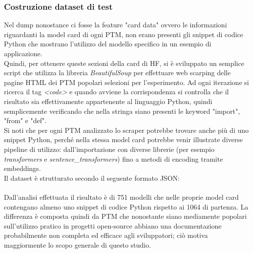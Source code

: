 \documentclass{article}
\begin{document}
\subsubsection{Costruzione dataset di test}
Nel dump \cite{ait_hfcommunity_2023} nonostance ci fosse la feature "card data" ovvero le informazioni riguardanti la model card di ogni PTM, non erano presenti gli snippet di codice Python che mostrano l'utilizzo del modello specifico in un esempio di applicazione.\\  
Quindi, per ottenere queste sezioni della card di HF, si è sviluppato un semplice script che utilizza la libreria \textit{BeautifulSoup}\cite{Richardson_Beautiful_Soup} per effettuare web scarping delle pagine HTML dei PTM popolari selezioni per l'esperimento. Ad ogni iterazione si ricerca il tag \textit{\textless code\textgreater} e quando avviene la corrispondenza si controlla che il risultato sia effettivamente appartenente al linguaggio Python, quindi semplicemente verificando che nella stringa siano presenti le keyword "import", "from" e "def".\\
Si noti che per ogni PTM analizzato lo scraper potrebbe trovare anche più di uno snippet Python, perché nella stessa model card potrebbe venir illustrate diverse pipeline di utilizzo: dall'importazione con diverse librerie (per esempio \textit{transformers} e \textit{sentence\_transformers}) fino a metodi di encoding tramite embeddings.\\
Il dataset è strutturato secondo il seguente formato JSON:\\
\\
Dall'analisi effettuata il risultato è di 751 modelli che nelle proprie model card contengano almeno uno snippet di codice Python rispetto ai 1064 di partenza. La differenza è composta quindi da PTM che nonostante siano mediamente popolari sull'utilizzo pratico in progetti open-source abbiano una documentazione probabilmente non completa ed efficace agli sviluppatori; ciò motiva maggiormente lo scopo generale di questo studio.
\end{document}
